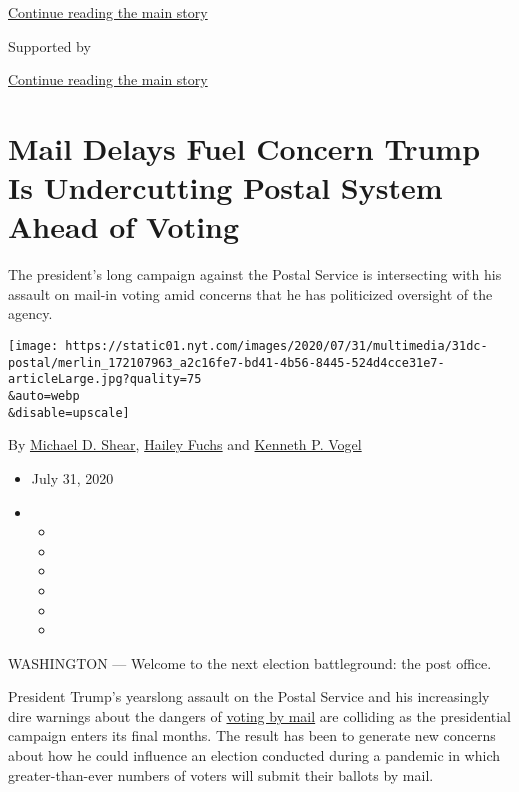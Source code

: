 \protect\hyperlink{after-top}{Continue reading the main story}

Supported by

\protect\hyperlink{after-sponsor}{Continue reading the main story}

\hypertarget{mail-delays-fuel-concern-trump-is-undercutting-postal-system-ahead-of-voting}{%
\section{Mail Delays Fuel Concern Trump Is Undercutting Postal System
Ahead of
Voting}\label{mail-delays-fuel-concern-trump-is-undercutting-postal-system-ahead-of-voting}}

The president's long campaign against the Postal Service is intersecting
with his assault on mail-in voting amid concerns that he has politicized
oversight of the agency.

\texttt{[image: https://static01.nyt.com/images/2020/07/31/multimedia/31dc-postal/merlin\_172107963\_a2c16fe7-bd41-4b56-8445-524d4cce31e7-articleLarge.jpg?quality=75\\\&auto=webp\\\&disable=upscale]}

By \href{https://www.nytimes.com/by/michael-d-shear}{Michael D. Shear},
\href{https://www.nytimes.com/by/hailey-fuchs}{Hailey Fuchs} and
\href{https://www.nytimes.com/by/kenneth-p-vogel}{Kenneth P. Vogel}

\begin{itemize}
\item
  July 31, 2020
\item
  \begin{itemize}
  \item
  \item
  \item
  \item
  \item
  \item
  \end{itemize}
\end{itemize}

WASHINGTON --- Welcome to the next election battleground: the post
office.

President Trump's yearslong assault on the Postal Service and his
increasingly dire warnings about the dangers of
\href{https://www.nytimes.com/2020/08/03/us/politics/trump-mail-in-voting.html}{voting
by mail} are colliding as the presidential campaign enters its final
months. The result has been to generate new concerns about how he could
influence an election conducted during a pandemic in which
greater-than-ever numbers of voters will submit their ballots by mail.

